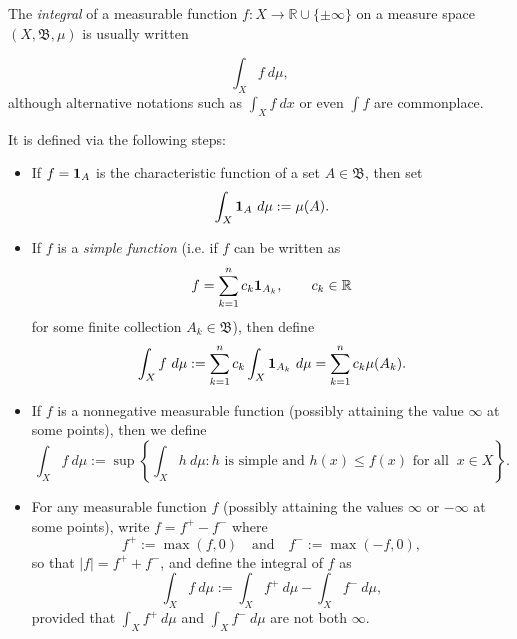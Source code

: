 \documentclass{article}
\newcommand{\borel}{\mathfrak{B}}
\newcommand{\defined}{:=}
\newcommand{\1}{{{\bf 1}}}
\begin{document}
The \emph{integral} of a measurable function $f\colon X \to \mathbb{R} \cup \{\pm \infty\}$ on a measure space $(X, \borel, \mu)$ is usually written

\begin{equation}
\int_{X} f\ d\mu,
\end{equation}
although alternative notations such as $\int_X f\ dx$ or even $\int f$ are commonplace.

It is defined via the following steps:

\begin{itemize}
\item If $f = \1_A$ is the characteristic function of a set $A \in \borel$, then set
\begin{equation}
\int_{X} \1_A\ d\mu \defined \mu(A).
\end{equation}
\item
If $f$ is a \emph{simple function} (i.e. if $f$ can be written as
\begin{equation}
f = \sum_{k=1}^{n} c_k \1_{A_k}, \qquad c_k \in \mathbb{R}
\end{equation}
for some finite collection $A_k \in \mathfrak{B}$), then define
\begin{equation}
\int_{X} f\ d\mu \defined \sum_{k=1}^{n} c_k \int_{X} \1_{A_k}\ d\mu = \sum_{k=1}^{n} c_k \mu(A_k).
\end{equation}
\item
If $f$ is a nonnegative measurable function (possibly attaining the value $\infty$ at some points), then we define
\begin{equation}
\int_{X} f\ d\mu \defined \sup\left\{ \int_{X} h\ d\mu : h \text{ is simple and  } h(x) \le f(x) \text{ for all }\ x \in X \right\}.
\end{equation}
\item
For any measurable function $f$ (possibly attaining the values $\infty$ or $-\infty$ at some points), write $f = f^{+} - f^{-}$ where
\begin{equation}
f^{+} \defined \max(f, 0) \quad \text{and} \quad f^{-} \defined \max(-f, 0),
\end{equation}
so that $|f|=f^+ + f^-$, and define the integral of $f$ as
\begin{equation}
\int_{X} f\ d\mu \defined \int_{X} f^{+}\ d\mu - \int_{X} f^{-}\ d\mu,
\end{equation}
provided that $\int_{X} f^{+}\ d\mu$ and $\int_{X} f^{-}\ d\mu$ are not both $\infty$.
\end{itemize}
\end{document}
